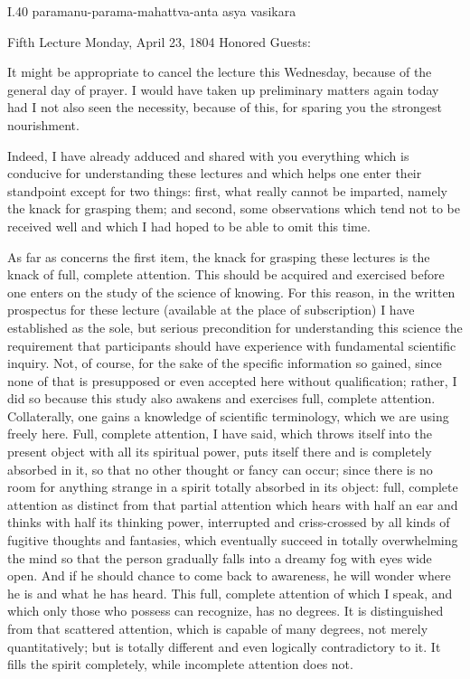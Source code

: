 I.40
paramanu-parama-mahattva-anta asya vasikara

Fifth Lecture
Monday, April 23, 1804
Honored Guests:

It might be appropriate to cancel the lecture this Wednesday,
because of the general day of prayer.
I would have taken up preliminary matters again today
had I not also seen the necessity, because of this,
for sparing you the strongest nourishment.

Indeed, I have already adduced and shared with you
everything which is conducive for understanding these lectures
and which helps one enter their standpoint except for two things:
first, what really cannot be imparted,
namely the knack for grasping them;
and second, some observations which tend
not to be received well and which
I had hoped to be able to omit this time.

As far as concerns the first item,
the knack for grasping these lectures is
the knack of full, complete attention.
This should be acquired and exercised
before one enters on the study of the science of knowing.
For this reason, in the written prospectus for these lecture
(available at the place of subscription)
I have established as the sole, but serious precondition
for understanding this science the requirement
that participants should have experience with
fundamental scientific inquiry.
Not, of course, for the sake of
the specific information so gained,
since none of that is presupposed
or even accepted here without qualification;
rather, I did so because this study also
awakens and exercises full, complete attention.
Collaterally, one gains a knowledge of scientific terminology,
which we are using freely here.
Full, complete attention, I have said,
which throws itself into the present object
with all its spiritual power,
puts itself there and is completely absorbed in it,
so that no other thought or fancy can occur;
since there is no room for anything strange
in a spirit totally absorbed in its object:
full, complete attention as distinct
from that partial attention
which hears with half an ear
and thinks with half its thinking power,
interrupted and criss-crossed by
all kinds of fugitive thoughts and fantasies,
which eventually succeed in totally overwhelming
the mind so that the person gradually falls
into a dreamy fog with eyes wide open.
And if he should chance to come back to awareness,
he will wonder where he is and what he has heard.
This full, complete attention of which I speak,
and which only those who possess can recognize, has no degrees.
It is distinguished from that scattered attention,
which is capable of many degrees, not merely quantitatively;
but is totally different and even logically contradictory to it.
It fills the spirit completely,
while incomplete attention does not.

